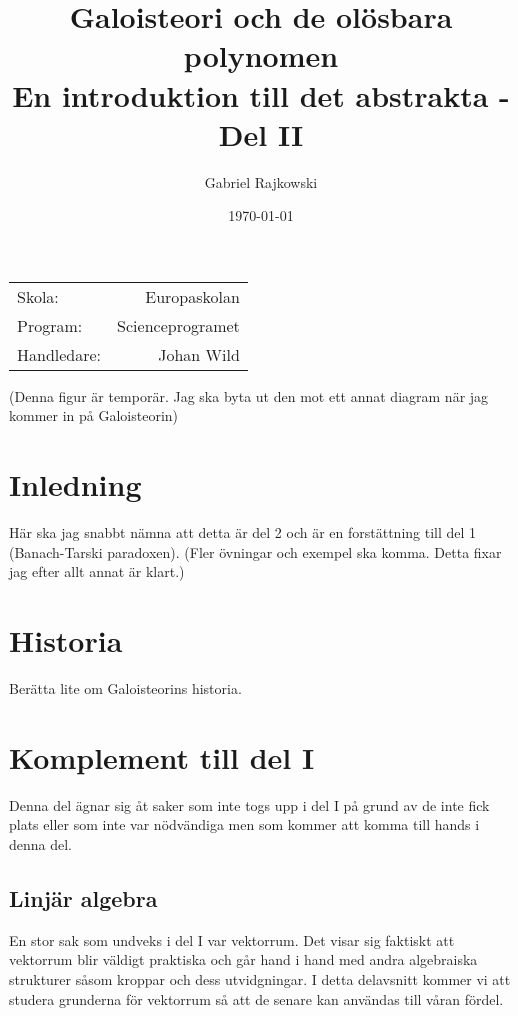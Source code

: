 \documentclass{article}
\theoremstyle{definition}
\begin{document}
\title{%
  Galoisteori och de olösbara polynomen \\
  \small{En introduktion till det abstrakta - Del II}
}
\author{Gabriel Rajkowski}
\date{\today}
\maketitle
\begin{center}
  \begin{tabular}{l r}
  Skola: & Europaskolan \\ 
  Program: & Scienceprogramet \\ 
  Handledare: & Johan Wild
  \end{tabular}
\end{center}
(Denna figur är temporär. Jag ska byta ut den mot ett annat diagram när jag kommer in på Galoisteorin)

\thispagestyle{empty}
  
\clearpage
\tableofcontents
\section{Inledning}
Här ska jag snabbt nämna att detta är del 2 och är en forstättning till del 1 (Banach-Tarski paradoxen). 
(Fler övningar och exempel ska komma. Detta fixar jag efter allt annat är klart.)
\section{Historia}
Berätta lite om Galoisteorins historia. 
\section{Komplement till del I}
Denna del ägnar sig åt saker som inte togs upp i del I på grund av de inte fick plats eller som inte var nödvändiga men som kommer att komma 
till hands i denna del.

\subsection{Linjär algebra}
En stor sak som undveks i del I var vektorrum. Det visar sig faktiskt att vektorrum blir väldigt praktiska och går hand i hand med andra 
algebraiska strukturer såsom kroppar och dess utvidgningar. I detta delavsnitt kommer vi att studera grunderna för vektorrum så att de senare kan användas till 
våran fördel.
\end{document}
